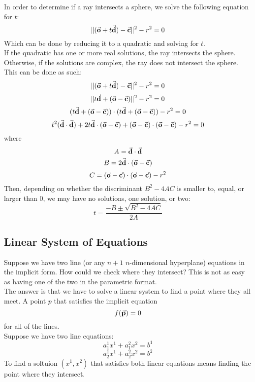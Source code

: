 \documentclass[12pt]{article}
\begin{document}
    In order to determine if a ray intersects a sphere,
    we solve the following equation for $t$:
    \[ 
        \| (\vec{\mathbf{o}} + t\vec{\mathbf{d}}) - \vec{\mathbf{c}} \|^2 - r^2 = 0
    \]
    Which can be done by reducing it to a quadratic
    and solving for $t$. \\
    If the quadratic has one or more real solutions,
    the ray intersects the sphere. \\
    Otherwise, if the solutions are complex,
    the ray does not intersect the sphere. \\

    This can be done as such:
    \[ 
        \| (\vec{\mathbf{o}} + t\vec{\mathbf{d}}) - \vec{\mathbf{c}} \|^2 - r^2 = 0
    \]
    \[ 
        \| t\vec{\mathbf{d}} + (\vec{\mathbf{o}} - \vec{\mathbf{c}}) \|^2 - r^2 = 0
    \]
    \[ 
        (t\vec{\mathbf{d}} + (\vec{\mathbf{o}} - \vec{\mathbf{c}})) \cdot
        (t\vec{\mathbf{d}} + (\vec{\mathbf{o}} - \vec{\mathbf{c}})) - r^2 = 0
    \]
    \[ 
        t^2(\vec{\mathbf{d}} \cdot \vec{\mathbf{d}}) 
        + 2t\vec{\mathbf{d}} \cdot (\vec{\mathbf{o}} - \vec{\mathbf{c}})
        + (\vec{\mathbf{o}} - \vec{\mathbf{c}})\cdot(\vec{\mathbf{o}} - \vec{\mathbf{c}}) - r^2 = 0
    \]
    where 
    \[ A = \vec{\mathbf{d}} \cdot \vec{\mathbf{d}} \]
    \[ B = 2\vec{\mathbf{d}} \cdot (\vec{\mathbf{o}} - \vec{\mathbf{c}}) \]
    \[ C = (\vec{\mathbf{o}} - \vec{\mathbf{c}})\cdot(\vec{\mathbf{o}} - \vec{\mathbf{c}}) - r^2 \]
    Then, depending on whether the discriminant
    $B^2  -4AC$
    is smaller to, equal, or larger than 0,
    we may have no solutions, one solution, or two:
    \[ t = \dfrac{-B \pm \sqrt{B^2 - 4AC} }{2A} \]

    \newpage

    \subsection*{Linear System of Equations}

    Suppose we have two line
    (or any $n+1$ $n$-dimensional hyperplane)
    equations in the implicit form.
    How could we check where they intersect?
    This is not as easy as having one of the two
    in the parametric format. \\
    The answer is that we have to solve a linear
    system to find a point where they all meet.
    A point $p$ that satisfies the implicit
    equation
    \[ f(\vec{\mathbf{p}}) = 0 \]
    for all of the lines. \\

    Suppose we have two line equations:
    \[ a_1^1x^1 + a_1^2x^2 = b^1 \]
    \[ a_2^1x^1 + a_2^2x^2 = b^2 \]
    To find a soltuion $(x^1, x^2)$ 
    that satisfies both linear equations
    means finding the point where they intersect. \\
\end{document}
